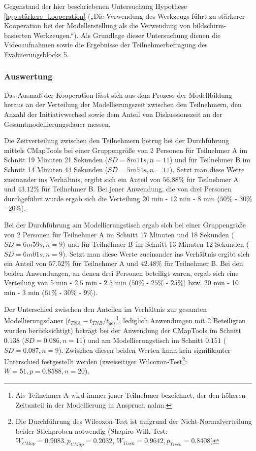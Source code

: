 Gegenstand der hier beschriebenen Untersuchung Hypothese \ref{hyp:stärkere_kooperation} („Die Verwendung des Werkzeugs führt zu stärkerer Kooperation bei der Modellerstellung als die Verwendung von bildschirm-basierten Werkzeugen.“). Als Grundlage dieser Untersuchung dienen die Videoaufnahmen sowie die Ergebnisse der Teilnehmerbefragung des Evaluierungsblocks 5.

\subsubsection{Auswertung} %

Das Ausmaß der Kooperation lässt sich aus dem Prozess der Modellbildung heraus an der Verteilung der Modellierungszeit zwischen den Teilnehmern, den Anzahl der Initiativwechsel sowie dem Anteil von Diskussionszeit an der Gesamtmodellierungsdauer messen.

Die Zeitverteilung zwischen den Teilnehmern betrug bei der Durchführung mittels CMapTools bei einer Gruppengröße von 2 Personen für Teilnehmer A im Schnitt 19 Minuten 21 Sekunden ($SD=8m11s, n=11$) und für Teilnehmer B im Schnitt 14 Minuten 44 Sekunden ($SD=5m54s, n=11$). Setzt man diese Werte zueinander ins Verhältnis, ergibt sich ein Anteil von $56.88\%$ für Teilnehmer A und $43.12\%$ für Teilnehmer B. Bei jener Anwendung, die von drei Personen durchgeführt wurde ergab sich die Verteilung 20 min - 12 min - 8 min ($50\%$ - $30\%$ - $20\%$). 

Bei der Durchführung am Modellierungstisch ergab sich bei einer Gruppengröße von 2 Personen für Teilnehmer A im Schnitt 17 Minuten und 18 Sekunden ($SD=6m59s, n=9$) und für Teilnehmer B im Schnitt 13 Minuten 12 Sekunden ($SD=6m01s, n=9$). Setzt man diese Werte zueinander ins Verhältnis ergibt sich ein Anteil von $57.52\%$ für Teilnehmer A und $42.48\%$ für Teilnehmer B. Bei den beiden Anwendungen, an denen drei Personen beteiligt waren, ergab sich eine Verteilung von 5 min - $2.5$ min - $2.5$ min ($50\%$ - $25\%$ - $25\%$) bzw. 20 min - 10 min - 3 min ($61\%$ - $30\%$ - $9\%$). 

Der Unterschied zwischen den Anteilen im Verhältnis zur gesamten Modellierungsdauer (${t_{TN A} - t_{TN B}}/t_{ges}$\footnote{Als Teilnehmer A wird immer jener Teilnehmer bezeichnet, der den höheren Zeitanteil in der Modellierung in Anspruch nahm.}, lediglich Anwendungen mit 2 Beteiligten wurden berücksichtigt) beträgt bei der Anwendung der CMapTools im Schnitt $0.138$ ($SD=0.086, n=11$) und am Modellierungstisch im Schnitt $0.151$ ($SD=0.087, n=9$). Zwischen diesen beiden Werten kann kein signifikanter Unterschied festgestellt werden (zweiseitiger Wilcoxon-Test\footnote{Die Durchführung des Wilcoxon-Test ist aufgrund der Nicht-Normalverteilung beider Stichproben notwendig (Shapiro-Wilk-Test: $W_{CMap} = 0.9083, p_{CMap} = 0.2032$, $W_{Tisch}= 0.9642, p_{Tisch} = 0.8408$)}: $W=51, p=0.8588, n=20$).

